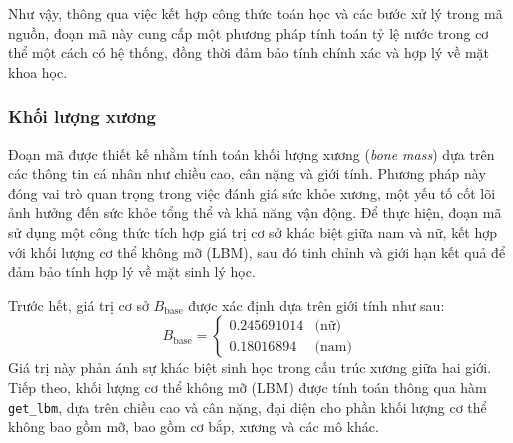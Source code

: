Như vậy, thông qua việc kết hợp công thức toán học và các bước xử lý trong mã nguồn, đoạn mã này cung cấp một phương pháp tính toán tỷ lệ nước trong cơ thể một cách có hệ thống, đồng thời đảm bảo tính chính xác và hợp lý về mặt khoa học.

\subsubsection{Khối lượng xương}

Đoạn mã được thiết kế nhằm tính toán khối lượng xương (\textit{bone mass}) dựa trên các thông tin cá nhân như chiều cao, cân nặng và giới tính. Phương pháp này đóng vai trò quan trọng trong việc đánh giá sức khỏe xương, một yếu tố cốt lõi ảnh hưởng đến sức khỏe tổng thể và khả năng vận động. Để thực hiện, đoạn mã sử dụng một công thức tích hợp giá trị cơ sở khác biệt giữa nam và nữ, kết hợp với khối lượng cơ thể không mỡ (LBM), sau đó tinh chỉnh và giới hạn kết quả để đảm bảo tính hợp lý về mặt sinh lý học.

Trước hết, giá trị cơ sở \( B_{\text{base}} \) được xác định dựa trên giới tính như sau:
\[
B_{\text{base}} = 
\begin{cases} 
0.245691014 & \text{(nữ)} \\
0.18016894 & \text{(nam)}
\end{cases}
\]
Giá trị này phản ánh sự khác biệt sinh học trong cấu trúc xương giữa hai giới. Tiếp theo, khối lượng cơ thể không mỡ (LBM) được tính toán thông qua hàm \texttt{get\_lbm}, dựa trên chiều cao và cân nặng, đại diện cho phần khối lượng cơ thể không bao gồm mỡ, bao gồm cơ bắp, xương và các mô khác.

